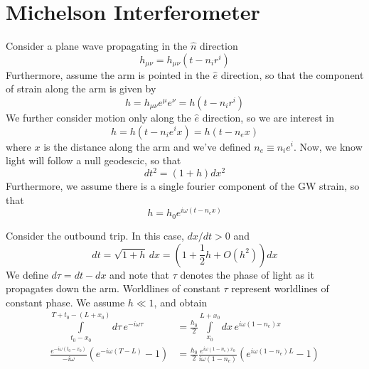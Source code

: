 \documentclass{article}
\begin{document}

\section*{Michelson Interferometer}

Consider a plane wave propagating in the $\hat{n}$ direction
\begin{equation}
    h_{\mu\nu} = h_{\mu\nu}(t-n_i r^i)
\end{equation}
Furthermore, assume the arm is pointed in the $\hat{e}$ direction, so that the component of strain along the arm is given by
\begin{equation}
    h = h_{\mu\nu}e^\mu e^\nu = h(t-n_i r^i)
\end{equation}
We further consider motion only along the $\hat{e}$ direction, so we are interest in
\begin{equation}
    h = h(t-n_i e^i x) = h(t-n_e x)
\end{equation}
where $x$ is the distance along the arm and we've defined $n_e\equiv n_i e^i$.
Now, we know light will follow a null geodescic, so that
\begin{equation}
    dt^2 = (1+h)dx^2
\end{equation}
Furthermore, we assume there is a single fourier component of the GW strain, so that
\begin{equation}
    h = h_0 e^{i\omega(t-n_e x)}
\end{equation}

Consider the outbound trip.
In this case, $dx/dt > 0$ and
\begin{equation}
    dt = \sqrt{1+h}\, dx = (1 + \frac{1}{2}h + O(h^2))dx
\end{equation}
We define $d\tau = dt-dx$ and note that $\tau$ denotes the phase of light as it propagates down the arm.
Worldlines of constant $\tau$ represent worldlines of constant phase.
We assume $h\ll1$, and obtain
\begin{align}
    \int\limits_{t_0-x_0}^{T+t_0 - (L+x_0)} d\tau\, e^{-i\omega\tau} & = \frac{h_0}{2} \int\limits_{x_0}^{L+x_0} dx\, e^{i\omega(1-n_e)x} \\
    \frac{e^{-i\omega(t_0-x_0)}}{-i\omega}\left(e^{-i\omega(T-L)} - 1\right) & = \frac{h_0}{2}\frac{e^{i\omega(1-n_e)x_0}}{i\omega(1-n_e)}\left( e^{i\omega(1-n_e)L} - 1 \right)
\end{align}
\end{document}
